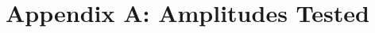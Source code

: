 \documentclass[aps,prd,twocolumn,showpacs,amsmath,amssymb]{revtex4-1}
\begin{document}
\begin{acknowledgements}
    \label{sec:acknowledgement}
    \vspace{-0.4cm}
\end{acknowledgements}


\section{Appendix A: Amplitudes Tested}
\label{app:tested_modes}


\end{document}

